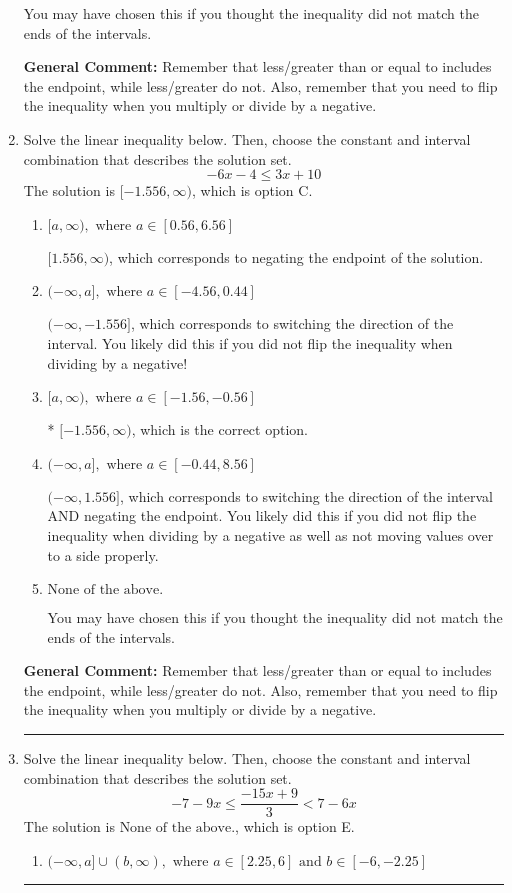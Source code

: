 \documentclass{extbook}[14pt]
\newcommand{\litem}[1]{\item #1

\rule{\textwidth}{0.4pt}}
\begin{document}
\begin{enumerate}
{\begin{enumerate}[label=\Alph*.]
You may have chosen this if you thought the inequality did not match the ends of the intervals.
\end{enumerate}

\textbf{General Comment:} Remember that less/greater than or equal to includes the endpoint, while less/greater do not. Also, remember that you need to flip the inequality when you multiply or divide by a negative.
}
\litem{
Solve the linear inequality below. Then, choose the constant and interval combination that describes the solution set.
\[ -6x -4 \leq 3x + 10 \]The solution is \( [-1.556, \infty) \), which is option C.\begin{enumerate}[label=\Alph*.]
\item \( [a, \infty), \text{ where } a \in [0.56, 6.56] \)

 $[1.556, \infty)$, which corresponds to negating the endpoint of the solution.
\item \( (-\infty, a], \text{ where } a \in [-4.56, 0.44] \)

 $(-\infty, -1.556]$, which corresponds to switching the direction of the interval. You likely did this if you did not flip the inequality when dividing by a negative!
\item \( [a, \infty), \text{ where } a \in [-1.56, -0.56] \)

* $[-1.556, \infty)$, which is the correct option.
\item \( (-\infty, a], \text{ where } a \in [-0.44, 8.56] \)

 $(-\infty, 1.556]$, which corresponds to switching the direction of the interval AND negating the endpoint. You likely did this if you did not flip the inequality when dividing by a negative as well as not moving values over to a side properly.
\item \( \text{None of the above}. \)

You may have chosen this if you thought the inequality did not match the ends of the intervals.
\end{enumerate}

\textbf{General Comment:} Remember that less/greater than or equal to includes the endpoint, while less/greater do not. Also, remember that you need to flip the inequality when you multiply or divide by a negative.
}
\litem{
Solve the linear inequality below. Then, choose the constant and interval combination that describes the solution set.
\[ -7 - 9 x \leq \frac{-15 x + 9}{3} < 7 - 6 x \]The solution is \( \text{None of the above.} \), which is option E.\begin{enumerate}[label=\Alph*.]
\item \( (-\infty, a] \cup (b, \infty), \text{ where } a \in [2.25, 6] \text{ and } b \in [-6, -2.25] \)


\end{enumerate}}
\end{enumerate}
\end{document}
